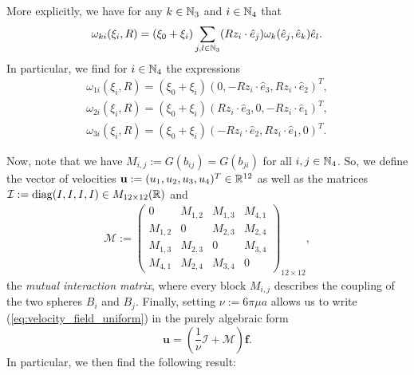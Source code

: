 \begin{remark}
More explicitly, we have for any $k \in \mathbb{N}_3$ and $i \in \mathbb{N}_4$ that
\begin{equation}
	\omega_{ki}(\xi_i, R) = (\xi_0 + \xi_i) \sum_{j,l \in \mathbb{N}_3}(R z_i \cdot \hat{e}_j)\omega_{k}(\hat{e}_{j}, \hat{e}_{k})\hat{e}_l.
\end{equation}
In particular, we find for $i \in \mathbb{N}_4$ the expressions
\begin{equation}
\begin{array}{lr}
	\omega_{1i}(\xi_i, R) = (\xi_0 + \xi_i) \left (
	0 ,
	-R z_i \cdot \hat{e}_3,
	R z_i \cdot \hat{e}_2
	\right )^T,\\
	\omega_{2i}(\xi_i, R) = (\xi_0 + \xi_i) \left (
	R z_i \cdot \hat{e}_3 ,
	0,
	- R z_i \cdot \hat{e}_1
	\right )^T,\\
	\omega_{3i}(\xi_i, R) = (\xi_0 + \xi_i) \left (
	- R z_i \cdot \hat{e}_2 ,
	R z_i \cdot \hat{e}_1,
	0
	\right )^T.
\end{array}
\end{equation}
\end{remark}

Now, note that we have $M_{i,j} := G(b_{ij}) = G(b_{ji})$ for all $i, j \in \mathbb{N}_4$. So, we define  the vector of velocities $\mathbf{u} := (u_1, u_2, u_3, u_4)^T \in \mathbb{R}^{12}$ as well as the matrices $\mathcal{I} := \operatorname{diag}(I, I, I, I) \in M_{12 \times 12}(\mathbb{R})$ and
\begin{align}
\mathcal{M} := \left (\begin{array}{cccc}
0 & M_{1,2} & M_{1,3} & M_{4,1} \\ 
M_{1,2} & 0 & M_{2,3} & M_{2,4} \\ 
M_{1,3} & M_{2,3} & 0 & M_{3,4} \\ 
M_{4,1} & M_{2,4} & M_{3,4} & 0
\end{array}  \right )_{12 \times 12},
\end{align}
the \emph{mutual interaction matrix}, where every block $M_{i,j}$ describes the coupling of the two spheres $B_i$ and $B_j$. Finally, setting $\nu := 6 \pi \mu a$ allows us to write (\ref{eq:velocity_field_uniform}) in the purely algebraic form
\begin{equation}
	\mathbf{u} = (\frac{1}{\nu} \mathcal{I} + \mathcal{M}) \boldsymbol f.
\end{equation}
In particular, we then find the following result:

